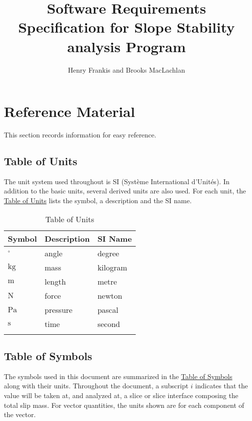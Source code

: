 \documentclass[12pt]{article}
\title{Software Requirements Specification for Slope Stability analysis Program}
\author{Henry Frankis and Brooks MacLachlan}
\begin{document}
\maketitle
\tableofcontents
\newpage
\section{Reference Material}
\label{Sec:RefMat}
This section records information for easy reference.

\subsection{Table of Units}
\label{Sec:ToU}
The unit system used throughout is SI (Système International d'Unités). In addition to the basic units, several derived units are also used. For each unit, the \hyperref[Table:ToU]{Table of Units} lists the symbol, a description and the SI name.

\begin{longtable}{l l l}
\toprule
\textbf{Symbol} & \textbf{Description} & \textbf{SI Name}
\\
\midrule
\endhead
${{}^{\circ}}$ & angle & degree
\\
${\text{kg}}$ & mass & kilogram
\\
${\text{m}}$ & length & metre
\\
${\text{N}}$ & force & newton
\\
${\text{Pa}}$ & pressure & pascal
\\
${\text{s}}$ & time & second
\\
\bottomrule
\caption{Table of Units}
\label{Table:ToU}
\end{longtable}
\subsection{Table of Symbols}
\label{Sec:ToS}
The symbols used in this document are summarized in the \hyperref[Table:ToS]{Table of Symbols} along with their units. Throughout the document, a subscript $i$ indicates that the value will be taken at, and analyzed at, a slice or slice interface composing the total slip mass. For vector quantities, the units shown are for each component of the vector.
\end{document}
